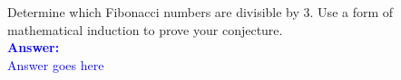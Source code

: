 \item{}
Determine which Fibonacci numbers are divisible by $3$. Use a form of
mathematical induction to prove your conjecture.\\[12pt]
\ifanswers
\textcolor{blue}{
\textbf{Answer:}\\[6pt]
Answer goes here
}
\newpage
\fi
